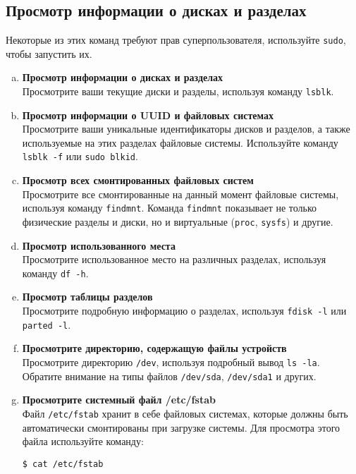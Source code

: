 \documentclass{article}
\begin{document}
\subsection{Просмотр информации о дисках и разделах}
Некоторые из этих команд требуют прав суперпользователя, используйте \texttt{sudo}, чтобы запустить их.
\begin{enumerate}[a.]
\item \textbf{Просмотр информации о дисках и разделах}\\
Просмотрите ваши текущие диски и разделы, используя команду \texttt{lsblk}.

\item \textbf{Просмотр информации о UUID и файловых системах}\\
Просмотрите ваши уникальные идентификаторы дисков и разделов, а также используемые на этих разделах файловые системы. Используйте команду \texttt{lsblk -f} или \texttt{sudo blkid}.

\item \textbf{Просмотр всех смонтированных файловых систем}\\
Просмотрите все смонтированные на данный момент файловые системы, используя команду \texttt{findmnt}. Команда \texttt{findmnt} показывает не только физические разделы и диски, но и виртуальные (\texttt{proc}, \texttt{sysfs}) и другие.

\item \textbf{Просмотр использованного места}\\
Просмотрите использованное место на различных разделах, используя команду \texttt{df -h}.

\item \textbf{Просмотр таблицы разделов}\\
Просмотрите подробную информацию о разделах, используя \texttt{fdisk -l} или \texttt{parted -l}.


\item \textbf{Просмотрите директорию, содержащую файлы устройств}\\
Просмотрите директорию \texttt{/dev}, используя подробный вывод \texttt{ls -la}. Обратите внимание на типы файлов \texttt{/dev/sda}, \texttt{/dev/sda1} и других.

\item \textbf{Просмотрите системный файл /etc/fstab}\\
Файл \texttt{/etc/fstab} хранит в себе файловых системах, которые должны быть автоматически смонтированы при загрузке системы. Для просмотра этого файла используйте команду:
\begin{lstlisting}
$ cat /etc/fstab
\end{lstlisting}
\end{enumerate}
\end{document}
